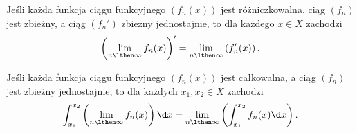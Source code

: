 \begin{theorem}
    \label{t:differentiable limit}
    Jeśli każda funkcja ciągu funkcyjnego $(f_n(x))$ jest różniczkowalna, ciąg $(f_n)$ jest zbieżny, a ciąg $(f_n')$ zbieżny jednostajnie, to dla każdego $x \in X$ zachodzi
    \[ \left(\lim_{n\lthen\infty} f_n(x)\right)' = \lim_{n\lthen\infty} \left(f_n'(x)\right). \]
\end{theorem}

\begin{theorem}
    \label{t:integrable limit}
    Jeśli każda funkcja ciągu funkcyjnego $(f_n(x))$ jest całkowalna, a ciąg $(f_n)$ jest zbieżny jednostajnie, to dla każdych $x_1, x_2 \in X$ zachodzi
    \[ \int_{x_1}^{x_2}\left(\lim_{n\lthen\infty} f_n(x)\right) \d x = \lim_{n\lthen\infty} \left(\int_{x_1}^{x_2} f_n(x) \d x\right). \]
\end{theorem}